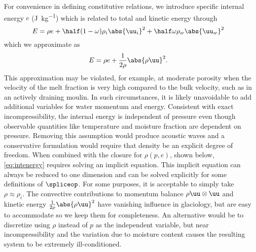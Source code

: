 For convenience in defining constitutive relations, we introduce specific internal energy $e$ (\si{\joule\per\kilogram}) which is related to total and kinetic energy through
\begin{equation*}
  E = \rho e + \half (1-\omega) \rho_i \abs{\uu_i}^2 + \half \omega \rho_w \abs{\uu_w}^2
\end{equation*}
which we approximate as
\begin{equation}\label{eq:intenergy}
  E = \rho e +  \frac{1}{2\rho} \abs{\rho\uu}^2 .
\end{equation}
This approximation may be violated, for example, at moderate porosity when the velocity of the melt fraction is very high compared to the bulk velocity, such as in an actively draining moulin.
In such circumstances, it is likely unavoidable to add additional variables for water momentum and energy.
Consistent with exact incompressibility, the internal energy is independent of pressure even though observable quantities like temperature and moisture fraction are dependent on pressure.
Removing this assumption would produce acoustic waves and a conservative formulation would require that density be an explicit degree of freedom.
When combined with the closure for $\rho(p,e)$, shown below, \eqref{eq:intenergy} requires solving an implicit equation.
This implicit equation can always be reduced to one dimension and can be solved explicitly for some definitions of $\spliceop$.
For some purposes, it is acceptable to simply take $\rho \approx \rho_i$.
The convective contributions to momentum balance $\rho\uu\otimes\uu$ and kinetic energy $\frac{1}{2\rho}\abs{\rho\uu}^2$ have vanishing influence in glaciology, but are easy to accommodate so we keep them for completeness.
An alternative would be to discretize using $\rho$ instead of $p$ as the independent variable, but near incompressibility and the variation due to moisture content causes the resulting system to be extremely ill-conditioned.

